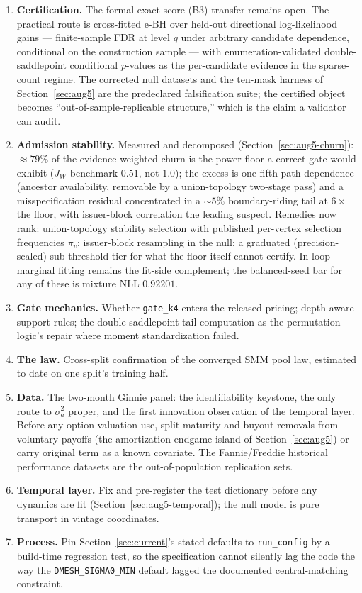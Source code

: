 \documentclass[11pt]{article}
\begin{document}
\begin{enumerate}[leftmargin=2em,itemsep=3pt]
\item \textbf{Certification.} The formal exact-score (B3) transfer remains open.
The practical route is cross-fitted e-BH over held-out directional
log-likelihood gains --- finite-sample FDR at level $q$ under arbitrary
candidate dependence, conditional on the construction sample --- with
enumeration-validated double-saddlepoint conditional $p$-values as the
per-candidate evidence in the sparse-count regime. The corrected null datasets
and the ten-mask harness of Section~\ref{sec:aug5} are the predeclared
falsification suite; the certified object becomes ``out-of-sample-replicable
structure,'' which is the claim a validator can audit.
\item \textbf{Admission stability.} Measured and decomposed
(Section~\ref{sec:aug5-churn}): $\approx79\%$ of the evidence-weighted churn
is the power floor a correct gate would exhibit ($J_W$ benchmark $0.51$, not
$1.0$); the excess is one-fifth path dependence (ancestor availability,
removable by a union-topology two-stage pass) and a misspecification residual
concentrated in a $\sim5\%$ boundary-riding tail at $6\times$ the floor,
with issuer-block correlation the leading suspect. Remedies now rank:
union-topology stability selection with published per-vertex selection
frequencies $\pi_v$; issuer-block resampling in the null; a graduated
(precision-scaled) sub-threshold tier for what the floor itself cannot
certify. In-loop marginal fitting remains the fit-side complement; the
balanced-seed bar for any of these is mixture NLL $0.92201$.
\item \textbf{Gate mechanics.} Whether \texttt{gate\_k4} enters the released
pricing; depth-aware support rules; the double-saddlepoint tail computation as
the permutation logic's repair where moment standardization failed.
\item \textbf{The law.} Cross-split confirmation of the converged SMM pool law,
estimated to date on one split's training half.
\item \textbf{Data.} The two-month Ginnie panel: the identifiability keystone,
the only route to $\sigma_a^2$ proper, and the first innovation observation of
the temporal layer. Before any option-valuation use, split maturity and buyout
removals from voluntary payoffs (the amortization-endgame island of
Section~\ref{sec:aug5}) or carry original term as a known covariate. The
Fannie/Freddie historical performance datasets are the out-of-population
replication sets.
\item \textbf{Temporal layer.} Fix and pre-register the test dictionary before
any dynamics are fit (Section~\ref{sec:aug5-temporal}); the null model is pure
transport in vintage coordinates.
\item \textbf{Process.} Pin Section~\ref{sec:current}'s stated defaults to
\texttt{run\_config} by a build-time regression test, so the specification
cannot silently lag the code the way the \texttt{DMESH\_SIGMA0\_MIN} default
lagged the documented central-matching constraint.
\end{enumerate}
\end{document}
